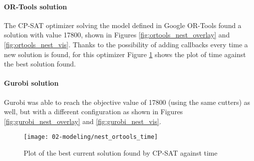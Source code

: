 \paragraph{OR-Tools solution} 
The CP-SAT optimizer solving the model defined in Google OR-Tools found a solution with value 17800, shown in Figures \ref{fig:ortools_nest_overlay} and \ref{fig:ortools_nest_vis}. Thanks to the possibility of adding callbacks every time a new solution is found, for this optimizer Figure \ref{fig:ortools_time} shows the plot of time against the best solution found. 

\paragraph{Gurobi solution}
Gurobi was able to reach the objective value of 17800 (using the same cutters) as well, but with a different configuration as shown in Figures \ref{fig:gurobi_nest_overlay} and \ref{fig:gurobi_nest_vis}.

\begin{figure}[H]
	\centering	
	\texttt{[image: 02-modeling/nest\_ortools\_time]}
	\caption{Plot of the best current solution found by CP-SAT against time}
	\label{fig:ortools_time}
\end{figure}

